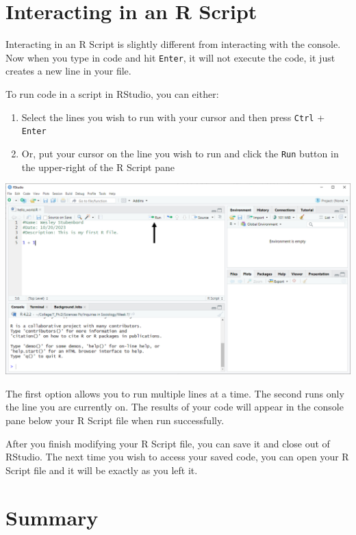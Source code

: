 \documentclass[
]{book}
\providecommand{\tightlist}{%
  \setlength{\itemsep}{0pt}\setlength{\parskip}{0pt}}
\begin{document}
\hypertarget{interacting-in-an-r-script}{%
\section{Interacting in an R Script}\label{interacting-in-an-r-script}}

Interacting in an R Script is slightly different from interacting with the console. Now when you type in code and hit \texttt{Enter}, it will not execute the code, it just creates a new line in your file.

To run code in a script in RStudio, you can either:

\begin{enumerate}
\def\labelenumi{\arabic{enumi}.}
\tightlist
\item
  Select the lines you wish to run with your cursor and then press \texttt{Ctrl} + \texttt{Enter}
\item
  Or, put your cursor on the line you wish to run and click the \texttt{Run} button in the upper-right of the R Script pane
\end{enumerate}

\includegraphics{docs/_main_files/figure-html/RStudio_Run button.png}

The first option allows you to run multiple lines at a time. The second runs only the line you are currently on. The results of your code will appear in the console pane below your R Script file when run successfully.

After you finish modifying your R Script file, you can save it and close out of RStudio. The next time you wish to access your saved code, you can open your R Script file and it will be exactly as you left it.

\hypertarget{summary}{%
\section{Summary}\label{summary}}
\end{document}

